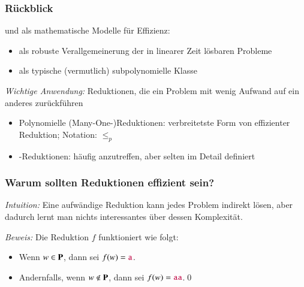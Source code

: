\documentclass[onlymath]{beamer}
\begin{document}
\maketitle

\begin{frame}\frametitle{Rückblick}

 und  als mathematische Modelle für Effizienz:
\begin{itemize}
\item {} als robuste Verallgemeinerung der in linearer Zeit lösbaren Probleme
\item {} als typische (vermutlich) subpolynomielle Klasse
\end{itemize}\bigskip

\emph{Wichtige Anwendung:} Reduktionen, die ein Problem mit wenig Aufwand auf ein anderes zurückführen
\begin{itemize}
\item \alert{Polynomielle (Many-One-)Reduktionen:} verbreitetste Form von effizienter Reduktion; Notation: $\leq_p$
\item \alert{-Reduktionen:} häufig anzutreffen, aber selten im Detail definiert
\end{itemize}

\end{frame}

\begin{frame}\frametitle{Warum sollten Reduktionen effizient sein?}

\emph{Intuition:} Eine aufwändige Reduktion kann jedes Problem indirekt lösen, aber dadurch lernt man nichts
interessantes über dessen Komplexität.\pause
\bigskip

\pause

\emph{Beweis:} Die Reduktion $f$ funktioniert wie folgt:
\begin{itemize}
\item Wenn $w\in \textbf{\textcolor{black}{P}}$, dann sei $f(w)=\mathtt{\textcolor{purple}{a}}$.
\item Andernfalls, wenn $w\notin \textbf{\textcolor{black}{P}}$, dann sei $f(w)=\mathtt{\textcolor{purple}{aa}}$.\qed
\end{itemize}

\end{frame}
\end{document}
